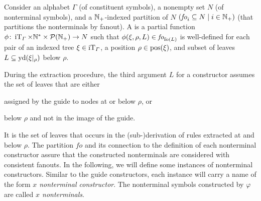 \documentclass[../../document.tex]{subfiles}
\begin{document}
    \begin{definition}
        Consider an alphabet \(\varGamma\) (of constituent symbols), a nonempty set \(N\) (of nonterminal symbols), and a \(\mathbb{N}_+\)-indexed partition of \(N\) \((\mathit{fo}_i \subseteq N \mid i \in \mathbb{N}_+)\) (that partitions the nonterminals by fanout).
        A  is a partial function \(\phi\colon \operatorname{iT}_\varGamma \times \mathbb{N}^* \times \mathcal{P}(\mathbb{N}_+) \to N\) such that \(\phi(\xi, \rho, L) \in \mathit{fo}_{\operatorname{fo}(L)}\) is well-defined for each pair of an indexed tree \(\xi \in \operatorname{iT}_\varGamma\), a position \(\rho \in \operatorname{pos}(\xi)\), and subset of leaves \(L \subseteq \operatorname{yd}(\xi|_\rho)\) below \(\rho\).
    \end{definition}


    During the extraction procedure, the third argument \(L\) for a constructor assumes the set of leaves that are either
    \begin{inparaenum}
        \item assigned by the guide to nodes at or below \(\rho\), or
        \item below \(\rho\) and not in the image of the guide.
    \end{inparaenum}
    It is the set of leaves that occurs in the (sub-)derivation of rules extracted at and below \(\rho\).
    The partition \(\mathit{fo}\) and its connection to the definition of each nonterminal constructor assure that the constructed nonterminals are considered with consistent fanouts.
    In the following, we will define some instances of nonterminal constructors.
    Similar to the guide constructors, each instance will carry a name of the form \emph{\(x\) nonterminal constructor}.
    The nonterminal symbols constructed by \(\varphi\) are called \emph{\(x\) nonterminals}.
\end{document}
